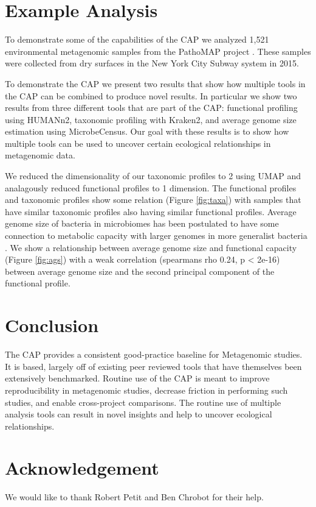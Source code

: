 \section{Example Analysis}

To demonstrate some of the capabilities of the CAP we analyzed 1,521 environmental metagenomic samples from the PathoMAP project \citep{Afshinnekoo2015}. These samples were collected from dry surfaces in the New York City Subway system in 2015.



To demonstrate the CAP we present two results that show how multiple tools in the CAP can be combined to produce novel results. In particular we show two results from three different tools that are part of the CAP: functional profiling using HUMANn2, taxonomic profiling with Kraken2, and average genome size estimation using MicrobeCensus. Our goal with these results is to show how multiple tools can be used to uncover certain ecological relationships in metagenomic data.



We reduced the dimensionality of our taxonomic profiles to 2 using UMAP and analagously reduced functional profiles to 1 dimension. The functional profiles and taxonomic profiles show some relation (Figure \ref{fig:taxa}) with samples that have similar taxonomic profiles also having similar functional profiles. Average genome size of bacteria in microbiomes has been postulated to have some connection to metabolic capacity with larger genomes in more generalist bacteria \citep{Nayfach2015}. We show a relationship between average genome size and functional capacity (Figure \ref{fig:ags}) with a weak correlation (spearmans rho 0.24, p < 2e-16) between average genome size and the second principal component of the functional profile.

\section{Conclusion}

The CAP provides a consistent good-practice baseline for Metagenomic studies. It is based, largely off of existing peer reviewed tools that have themselves been extensively benchmarked. Routine use of the CAP is meant to improve reproducibility in metagenomic studies, decrease friction in performing such studies, and enable cross-project comparisons. The routine use of multiple analysis tools can result in novel insights and help to uncover ecological relationships.

\section{Acknowledgement}

We would like to thank Robert Petit and Ben Chrobot for their help.

